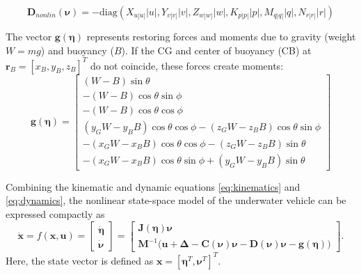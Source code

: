 \begin{equation}
    \mathbf{D}_{nonlin}(\boldsymbol{\nu}) = -\text{diag}(X_{u|u|}|u|, Y_{v|v|}|v|, Z_{w|w|}|w|, K_{p|p|}|p|, M_{q|q|}|q|, N_{r|r|}|r|)
\end{equation}

The vector $\mathbf{g}(\boldsymbol{\eta})$ represents restoring forces and moments due to gravity (weight $W=mg$) and buoyancy ($B$). If the CG and center of buoyancy (CB) at $\boldsymbol{r}_B = [x_B, y_B, z_B]^T$ do not coincide, these forces create moments:
\begin{equation}
    \mathbf{g}(\boldsymbol{\eta}) =
    \begin{bmatrix}
        (W-B)\sin\theta \\
        -(W-B)\cos\theta\sin\phi \\
        -(W-B)\cos\theta\cos\phi \\
        (y_G W - y_B B)\cos\theta\cos\phi - (z_G W - z_B B)\cos\theta\sin\phi \\
        -(x_G W - x_B B)\cos\theta\cos\phi - (z_G W - z_B B)\sin\theta \\ %
        -(x_G W - x_B B)\cos\theta\sin\phi + (y_G W - y_B B)\sin\theta %
    \end{bmatrix}
\end{equation}



Combining the kinematic and dynamic equations \eqref{eq:kinematics} and \eqref{eq:dynamics}, the nonlinear state-space model of the underwater vehicle can be expressed compactly as
\begin{equation}
    \dot{\boldsymbol{x}} = f(\boldsymbol{x}, \mathbf{u}) = 
    \begin{bmatrix}
        \dot{\boldsymbol{\eta}} \\
        \dot{\boldsymbol{\nu}}
    \end{bmatrix}
    =
    \begin{bmatrix}
        \mathbf{J}(\boldsymbol{\eta}) \boldsymbol{\nu} \\
        \mathbf{M}^{-1} \big( \mathbf{u} + \boldsymbol{\Delta} - \mathbf{C}(\boldsymbol{\nu}) \boldsymbol{\nu} - \mathbf{D}(\boldsymbol{\nu}) \boldsymbol{\nu} - \mathbf{g}(\boldsymbol{\eta}) \big)
    \end{bmatrix}.
\end{equation}
Here, the state vector is defined as \(\boldsymbol{x} = [\boldsymbol{\eta}^T, \boldsymbol{\nu}^T]^T\).



